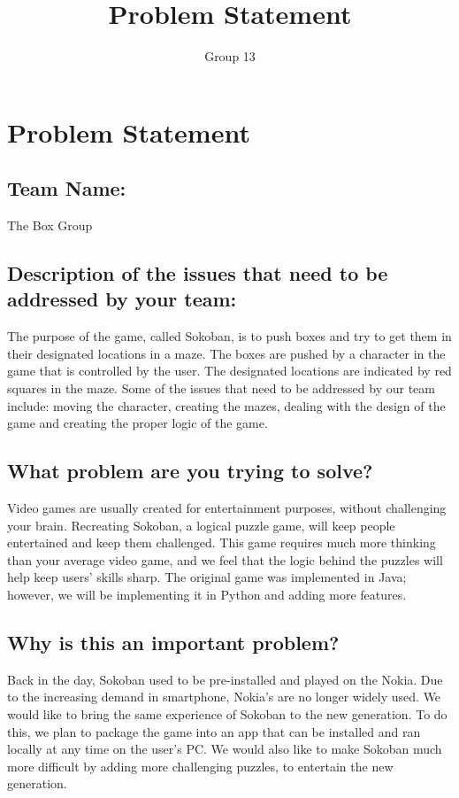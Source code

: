 \documentclass[11pt, oneside]{article}
\title{Problem Statement}
\author{Group 13}
\begin{document}
\marginpar{}
\section*{Problem Statement}
\subsection*{Team Name:} The Box Group
\subsection*{Description of the issues that need to be addressed by your team:}

The purpose of the game, called Sokoban, is to push boxes and try to get them in their designated locations in a maze. The boxes are pushed by a character in the game that is controlled by the user. The designated locations are indicated by red squares in the maze. Some of the issues that need to be addressed by our team include: moving the character, creating the mazes, dealing with the design of the game and creating the proper logic of the game.
\subsection*{What problem are you trying to solve?}

Video games are usually created for entertainment purposes, without challenging your brain. Recreating Sokoban, a logical puzzle game, will keep people entertained and keep them challenged. This game requires much more thinking than your average video game, and we feel that the logic behind the puzzles will help keep users’ skills sharp. The original game was implemented in Java; however, we will be implementing it in Python and adding more features.

\subsection*{Why is this an important problem?}

Back in the day, Sokoban used to be pre-installed and played on the Nokia. Due to the increasing demand in smartphone, Nokia’s are no longer widely used. We would like to bring the same experience of Sokoban to the new generation. To do this, we plan to package the game into an app that can be installed and ran locally at any time on the user’s PC. We would also like to make Sokoban much more difficult by adding more challenging puzzles, to entertain­ the new generation.
\end{document}
